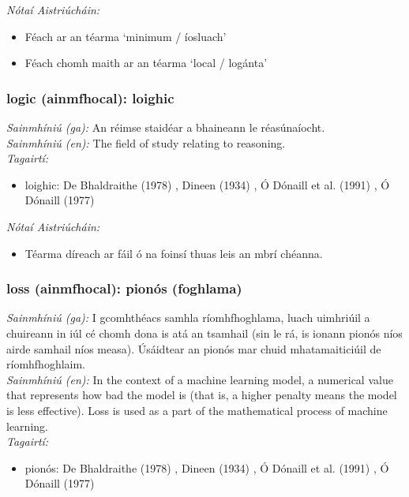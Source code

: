  \noindent \textit{Nótaí Aistriúcháin:}
\begin{itemize}
	\item Féach ar an téarma `minimum / íosluach'
	\item Féach chomh maith ar an téarma `local / logánta'
\end{itemize}


\subsubsection*{logic (ainmfhocal): loighic}
 \noindent \textit{Sainmhíniú (ga):} An réimse staidéar a bhaineann le réasúnaíocht.
\\
 \noindent \textit{Sainmhíniú (en):} The field of study relating to reasoning.
\\
 \noindent \textit{Tagairtí:}
\begin{itemize}
	\item loighic: De Bhaldraithe (1978) \cite{de-bhaldraithe}, Dineen (1934) \cite{dineen}, Ó Dónaill et al. (1991) \cite{focloir-beag}, Ó Dónaill (1977) \cite{odonaill}
\end{itemize}

 \noindent \textit{Nótaí Aistriúcháin:}
\begin{itemize}
	\item Téarma díreach ar fáil ó na foinsí thuas leis an mbrí chéanna.
\end{itemize}


\subsubsection*{loss (ainmfhocal): pionós (foghlama)}
 \noindent \textit{Sainmhíniú (ga):} I gcomhthéacs samhla ríomhfhoghlama, luach uimhriúil a chuireann in iúl cé chomh dona is atá an tsamhail (sin le rá, is ionann pionós níos airde samhail níos measa). Úsáidtear an pionós mar chuid mhatamaiticiúil de ríomhfhoghlaim.
\\
 \noindent \textit{Sainmhíniú (en):} In the context of a machine learning model, a numerical value that represents how bad the model is (that is, a higher penalty means the model is less effective). Loss is used as a part of the mathematical process of machine learning.
\\
 \noindent \textit{Tagairtí:}
\begin{itemize}
	\item pionós: De Bhaldraithe (1978) \cite{de-bhaldraithe}, Dineen (1934) \cite{dineen}, Ó Dónaill et al. (1991) \cite{focloir-beag}, Ó Dónaill (1977) \cite{odonaill}
\end{itemize}

